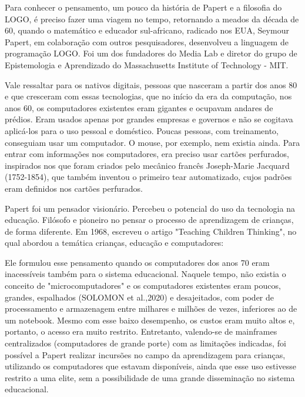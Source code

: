 Para conhecer  o pensamento, um pouco da história de Papert e  a filosofia do LOGO, é preciso fazer uma viagem no tempo, retornando a meados da década de 60, quando o matemático e educador sul-africano, radicado nos EUA, Seymour Papert, em colaboração com outros pesquisadores, desenvolveu a linguagem  de programação LOGO.  Foi um dos fundadores do Media Lab e diretor do grupo de Epistemologia e Aprendizado do Massachusetts Institute of Technology - MIT.

Vale ressaltar para os nativos digitais, pessoas que nasceram a partir dos anos 80 e que cresceram com essas tecnologias, que no início da era da computação, nos anos 60, os computadores existentes eram gigantes e ocupavam andares de prédios. Eram usados apenas por grandes empresas e governos e não se cogitava aplicá-los para o uso pessoal e doméstico. Poucas pessoas, com treinamento, conseguiam usar um computador. O mouse, por exemplo, nem existia ainda. Para entrar com informações nos computadores, era preciso usar cartões perfurados, inspirados nos que foram criados pelo mecânico francês Joseph-Marie Jacquard (1752-1854), que também inventou o primeiro tear automatizado, cujos padrões eram definidos nos cartões perfurados.

Papert foi um pensador visionário. Percebeu o potencial do uso da tecnologia na educação. Filósofo e pioneiro no pensar o processo de aprendizagem de crianças, de forma diferente. Em 1968, escreveu o artigo "Teaching Children Thinking", no qual abordou a temática crianças, educação e computadores:


\noindent\begin{center}\mbox{\centering{}}\end{center}


Ele formulou esse pensamento quando os computadores dos anos 70 eram inacessíveis também para o sistema educacional. Naquele tempo, não existia o conceito de "microcomputadores" e os computadores existentes eram poucos, grandes, espalhados  (SOLOMON et al.,2020) e desajeitados, com poder de processamento e armazenagem entre milhares e milhões de vezes, inferiores ao de um notebook. Mesmo com esse baixo desempenho, os custos eram muito altos e, portanto, o acesso era muito restrito. Entretanto, valendo-se de mainframes centralizados (computadores de grande porte) com as limitações indicadas, foi possível a Papert realizar incursões no campo da aprendizagem para crianças, utilizando os computadores que estavam disponíveis, ainda que esse uso estivesse restrito a uma elite, sem a possibilidade de uma grande disseminação no sistema educacional.

